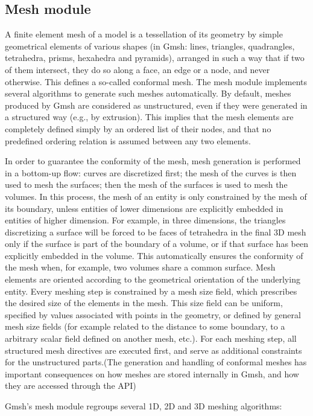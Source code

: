 \documentclass[dvipdfmx, 9pt, a4paper]{article}
\numberwithin{equation}{section}
\begin{document}
\subsection{Mesh module}
A finite element mesh of a model is a tessellation of its geometry by simple geometrical elements of various shapes (in Gmsh: lines, triangles, quadrangles, tetrahedra, prisms, hexahedra and pyramids), arranged in such a way that if two of them intersect, they do so along a face, an edge or a node, and never otherwise. This defines a so-called conformal mesh. The mesh module implements several algorithms to generate such meshes automatically. By default, meshes produced by Gmsh are considered as unstructured, even if they were generated in a structured way (e.g., by extrusion). This implies that the mesh elements are completely defined simply by an ordered list of their nodes, and that no predefined ordering relation is assumed between any two elements.\par
In order to guarantee the conformity of the mesh, mesh generation is performed in a bottom-up flow: curves are discretized first; the mesh of the curves is then used to mesh the surfaces; then the mesh of the surfaces is used to mesh the volumes. In this process, the mesh of an entity is only constrained by the mesh of its boundary, unless entities of lower dimensions are explicitly embedded in entities of higher dimension. For example, in three dimensions, the triangles discretizing a surface will be forced to be faces of tetrahedra in the final 3D mesh only if the surface is part of the boundary of a volume, or if that surface has been explicitly embedded in the volume. This automatically ensures the conformity of the mesh when, for example, two volumes share a common surface. Mesh elements are oriented according to the geometrical orientation of the underlying entity. Every meshing step is constrained by a mesh size field, which prescribes
the desired size of the elements in the mesh. This size field can be uniform, specified by values associated with points in the geometry, or defined by general mesh size fields (for example related to the distance to some boundary, to a arbitrary scalar field defined on another mesh, etc.).  For each meshing step, all structured mesh directives are executed first, and serve as additional constraints for the unstructured parts.(The generation and handling of conformal meshes has important consequences on how meshes are stored internally in Gmsh, and how they are accessed through the API)\par
Gmsh's mesh module regroups several 1D, 2D and 3D meshing algorithms:
\end{document}
